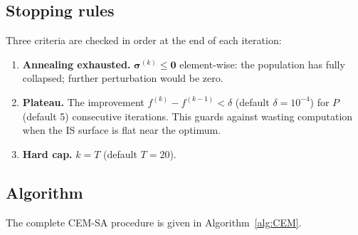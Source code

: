 \documentclass[12pt,a4paper]{article}
\begin{document}
\subsection{Stopping rules}\label{sec:stopping}

Three criteria are checked in order at the end of each iteration:
\begin{enumerate}
  \item \textbf{Annealing exhausted.} $\bm{\sigma}^{(k)} \leq \mathbf{0}$
    element-wise: the population has fully collapsed; further perturbation
    would be zero.
  \item \textbf{Plateau.} The improvement
    $f^{(k)} - f^{(k-1)} < \delta$ (default $\delta = 10^{-4}$) for $P$
    (default 5) consecutive iterations. This guards against wasting
    computation when the IS surface is flat near the optimum.
  \item \textbf{Hard cap.} $k = T$ (default $T = 20$).
\end{enumerate}

\subsection{Algorithm}\label{sec:CEMalg}

The complete CEM-SA procedure is given in Algorithm~\ref{alg:CEM}.
\end{document}
